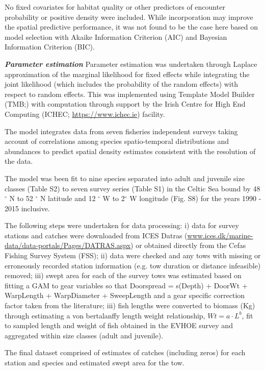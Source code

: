 \documentclass[12pt]{article}
\begin{document}
\begin{linenumbers}
No fixed covariates for habitat quality or other predictors of encounter
probability or positive density were included. While incorporation may improve
the spatial predictive performance\cite{Thorson2017}, it was not found to be
the case here based on model selection with Akaike Information Criterion (AIC)
and Bayesian Information Criterion (BIC).

\textbf{\textit{Parameter estimation}} Parameter estimation was undertaken
through Laplace approximation of the marginal likelihood for fixed effects
while integrating the joint likelihood (which includes the probability of the
random effects) with respect to random effects. This was implemented using
Template Model Builder (TMB;\cite{Kristensen2015}) with computation through
support by the Irish Centre for High End Computing (ICHEC;
\url{https://www.ichec.ie}) facility.  

The model integrates data from seven fisheries independent surveys taking
account of correlations among species spatio-temporal distributions and
abundances to predict spatial density estimates consistent with the resolution
of the data. 

The model was been fit to nine species separated into adult and juvenile size
classes (Table S2) to seven survey series (Table S1)
in the Celtic Sea bound by 48$^{\circ}$ N to 52 $^{\circ}$ N latitude and 12
$^{\circ}$ W to 2$^{\circ}$ W longitude (Fig. S8) for the years
1990 - 2015 inclusive. 

The following steps were undertaken for data processing: i) data for survey
stations and catches were downloaded from ICES Datras
(\url{www.ices.dk/marine-data/data-portals/Pages/DATRAS.aspx}) or obtained
directly from the Cefas Fishing Survey System (FSS); ii) data were checked and
any tows with missing or erroneously recorded station information (e.g. tow
duration or distance infeasible) removed; iii) swept area for each of the
survey tows was estimated based on fitting a GAM to gear variables so that
Doorspread = s(Depth) + DoorWt + WarpLength + WarpDiameter + SweepLength and a
gear specific correction factor taken from the literature\cite{Piet2009}; iii)
fish lengths were converted to biomass (Kg) through estimating a von
bertalanffy length weight relationship, $Wt = a \cdot L^{b}$, fit to sampled
length and weight of fish obtained in the EVHOE survey and aggregated within
size classes (adult and juvenile). 

The final dataset comprised of estimates of catches (including zeros) for each
station and species and estimated swept area for the tow.


\end{linenumbers}
\end{document}
